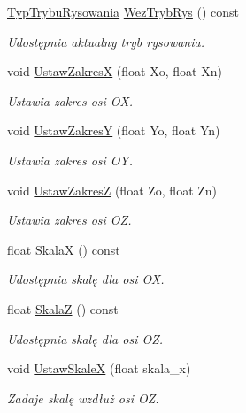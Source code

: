\begin{DoxyCompactItemize}
\mbox{\hyperlink{namespace_pz_g_aef59d70a0ee2eab473790613c3628944}{Typ\+Trybu\+Rysowania}} \mbox{\hyperlink{class_pz_g_1_1_lacze_do_g_n_u_plota_ae2fbf0d8f3f248f750804cec606a7983}{Wez\+Tryb\+Rys}} () const
\begin{DoxyCompactList}\small\item\em Udostępnia aktualny tryb rysowania. \end{DoxyCompactList}\item 
void \mbox{\hyperlink{class_pz_g_1_1_lacze_do_g_n_u_plota_a9c91987dfc869d6fcea96205c581daef}{Ustaw\+ZakresX}} (float Xo, float Xn)
\begin{DoxyCompactList}\small\item\em Ustawia zakres osi {\itshape OX}. \end{DoxyCompactList}\item 
void \mbox{\hyperlink{class_pz_g_1_1_lacze_do_g_n_u_plota_a54c6e9cf9ab2eae479451fd953c2717c}{Ustaw\+ZakresY}} (float Yo, float Yn)
\begin{DoxyCompactList}\small\item\em Ustawia zakres osi {\itshape OY}. \end{DoxyCompactList}\item 
void \mbox{\hyperlink{class_pz_g_1_1_lacze_do_g_n_u_plota_a1dbbb2b86fb13b8632e6bad9df2a82e3}{Ustaw\+ZakresZ}} (float Zo, float Zn)
\begin{DoxyCompactList}\small\item\em Ustawia zakres osi {\itshape OZ}. \end{DoxyCompactList}\item 
float \mbox{\hyperlink{class_pz_g_1_1_lacze_do_g_n_u_plota_a4b1eb252fd785a5aeff938e7b2dce2b1}{SkalaX}} () const
\begin{DoxyCompactList}\small\item\em Udostępnia skalę dla osi {\itshape OX}. \end{DoxyCompactList}\item 
float \mbox{\hyperlink{class_pz_g_1_1_lacze_do_g_n_u_plota_a44f922ccbc508d6cd7809c669238dae3}{SkalaZ}} () const
\begin{DoxyCompactList}\small\item\em Udostępnia skalę dla osi {\itshape OZ}. \end{DoxyCompactList}\item 
void \mbox{\hyperlink{class_pz_g_1_1_lacze_do_g_n_u_plota_a855b8338bfe3e5d294d719f24b11090e}{Ustaw\+SkaleX}} (float skala\+\_\+x)
\begin{DoxyCompactList}\small\item\em Zadaje skalę wzdłuż osi {\itshape OZ}. \end{DoxyCompactList}\item 

\end{DoxyCompactItemize}
